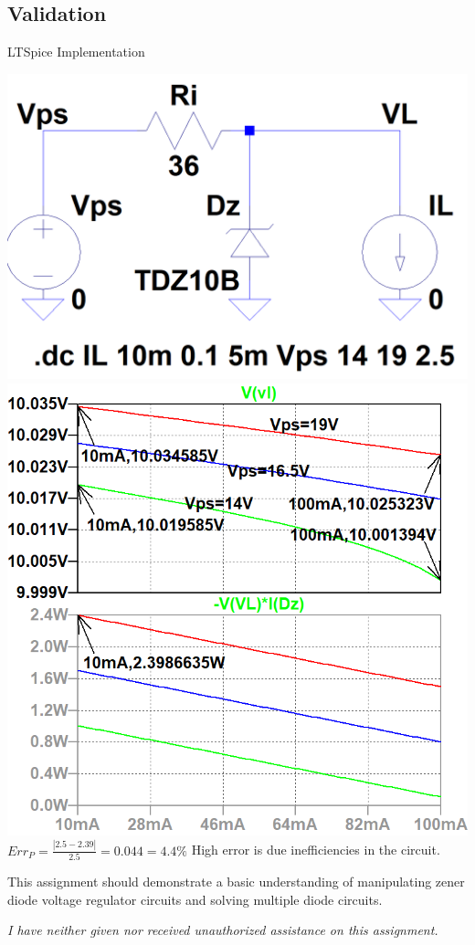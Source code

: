 \documentclass[12pt,letterpaper,titlepage]{article}
\begin{document}
\begin{raggedright}
\clearpage
\subsection{Validation}

\begin{center}
LTSpice Implementation

\includegraphics[width=.4\textwidth, height=\textheight, keepaspectratio=true]{ds2b}
\includegraphics[width=.49\textwidth, height=\textheight, keepaspectratio=true]{ds2c}
$Err_{P} = \frac{|2.5-2.39|}{2.5} = 0.044 = 4.4\%$ High error is due inefficiencies in the circuit.
\end{center}

This assignment should demonstrate a basic understanding of manipulating zener diode voltage regulator circuits and solving multiple diode circuits.

\textit{I have neither given nor received unauthorized assistance on this assignment.}


\end{raggedright}
\end{document}

